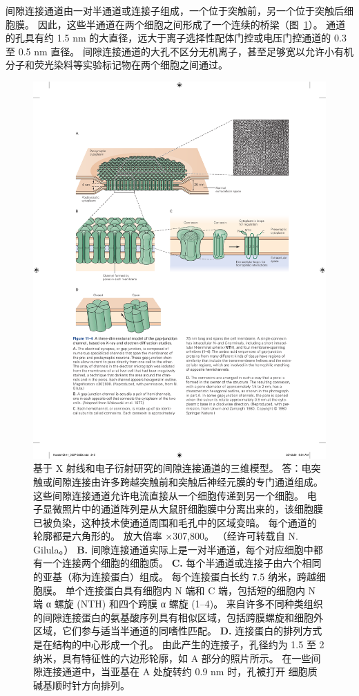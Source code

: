 间隙连接通道由一对半通道或连接子组成，一个位于突触前，另一个位于突触后细胞膜。
因此，这些半通道在两个细胞之间形成了一个连续的桥梁（图~\ref{fig:11_4}）。
通道的孔具有约 1.5 nm 的大直径，远大于离子选择性配体门控或电压门控通道的 0.3 至 0.5 nm 直径。
间隙连接通道的大孔不区分无机离子，甚至足够宽以允许小有机分子和荧光染料等实验标记物在两个细胞之间通过。


\begin{figure}[htbp]
	\centering
	\includegraphics[width=0.9\linewidth]{chap11/fig_11_4}
	\caption{基于 X 射线和电子衍射研究的间隙连接通道的三维模型。
		答：电突触或间隙连接由许多跨越突触前和突触后神经元膜的专门通道组成。
		这些间隙连接通道允许电流直接从一个细胞传递到另一个细胞。
		电子显微照片中的通道阵列是从大鼠肝细胞膜中分离出来的，该细胞膜已被负染，这种技术使通道周围和毛孔中的区域变暗。
		每个通道的轮廓都是六角形的。
		放大倍率 ×307,800。 （经许可转载自 N. Gilula。）
		\textbf{B.} 间隙连接通道实际上是一对半通道，每个对应细胞中都有一个连接两个细胞的细胞质\cite{makowski1977gap}。 
		\textbf{C.} 每个半通道或连接子由六个相同的亚基（称为连接蛋白）组成。
		每个连接蛋白长约 7.5 纳米，跨越细胞膜。
		单个连接蛋白具有细胞内 N 端和 C 端，包括短的细胞内 N 端 α 螺旋 (NTH) 和四个跨膜 α 螺旋 (1–4)。
		来自许多不同种类组织的间隙连接蛋白的氨基酸序列具有相似区域，包括跨膜螺旋和细胞外区域，它们参与适当半通道的同嗜性匹配。
		\textbf{D.} 连接蛋白的排列方式是在结构的中心形成一个孔。
		由此产生的连接子，孔径约为 1.5 至 2 纳米，具有特征性的六边形轮廓，如 A 部分的照片所示。
		在一些间隙连接通道中，当亚基在 A 处旋转约 0.9 nm 时，孔被打开 细胞质碱基顺时针方向排列\cite{unwin1980structure}。}
	\label{fig:11_4}
\end{figure}


